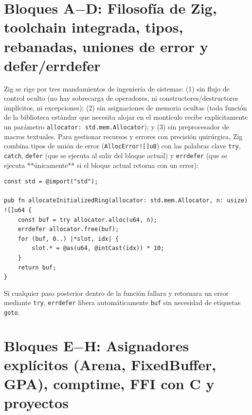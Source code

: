\documentclass{book}
\begin{document}
\section{Bloques A\(-\)D: Filosofía de Zig, toolchain integrada, tipos, rebanadas, uniones de error y defer/errdefer}

Zig se rige por tres mandamientos de ingeniería de sistemas: (1) sin flujo de control oculto (no hay sobrecarga de operadores, ni constructores/destructores implícitos, ni excepciones); (2) sin asignaciones de memoria ocultas (toda función de la biblioteca estándar que necesita alojar en el montículo recibe explícitamente un parámetro \texttt{allocator: std.mem.Allocator}); y (3) sin preprocesador de macros textuales. Para gestionar recursos y errores con precisión quirúrgica, Zig combina tipos de unión de error (\texttt{AllocError![]u8}) con las palabras clave \texttt{try}, \texttt{catch}, \texttt{defer} (que se ejecuta al salir del bloque actual) y \texttt{errdefer} (que se ejecuta **únicamente** si el bloque actual retorna con un error):
\begin{lstlisting}[style=studium]
const std = @import("std");

pub fn allocateInitializedRing(allocator: std.mem.Allocator, n: usize) ![]u64 {
    const buf = try allocator.alloc(u64, n);
    errdefer allocator.free(buf);
    for (buf, 0..) |*slot, idx| {
        slot.* = @as(u64, @intCast(idx)) * 10;
    }
    return buf;
}
\end{lstlisting}
Si cualquier paso posterior dentro de la función fallara y retornara un error mediante \texttt{try}, \texttt{errdefer} libera automáticamente \texttt{buf} sin necesidad de etiquetas \texttt{goto}.

\section{Bloques E\(-\)H: Asignadores explícitos (Arena, FixedBuffer, GPA), comptime, FFI con C y proyectos}
\end{document}
